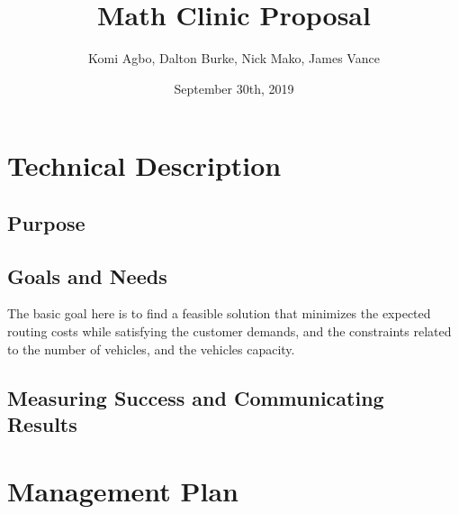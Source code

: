 \documentclass{article}
\title{Math Clinic Proposal}
\author{Komi Agbo, Dalton Burke, Nick Mako, James Vance}
\date{September 30th, 2019}
\begin{document}
\maketitle
\newpage

\section{Technical Description}

\subsection{Purpose}

\subsection{Goals and Needs}
The basic goal here is to find a feasible solution that minimizes the expected routing costs while satisfying the customer demands, and the constraints related to the number of vehicles, and the vehicles capacity.

\subsection{Measuring Success and Communicating Results}

\section{Management Plan}
\end{document}
